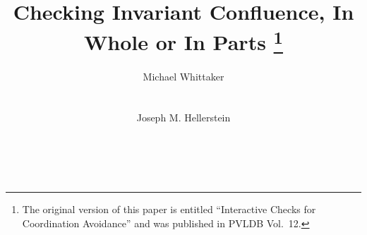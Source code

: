 \documentclass{research4cacm}
\begin{document}
\title{%
  Checking Invariant Confluence, In Whole or In Parts%
  \thanks{%
    The original version of this paper is entitled ``Interactive Checks for
    Coordination Avoidance'' and was published in PVLDB Vol.\ 12.
  }%
}

\author{
\alignauthor
Michael Whittaker\\
       \\
       \\
\alignauthor
Joseph M. Hellerstein\\
       \\
       \\
}

\maketitle

{}
{}
{}
{}
{}
{}
{}
{}
{}
{}



\balancecolumns
\end{document}
